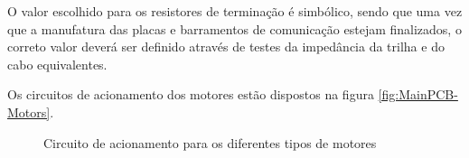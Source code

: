O valor escolhido para os resistores de terminação é simbólico,
sendo que uma vez que a manufatura das placas e barramentos de comunicação
estejam finalizados, o correto valor deverá ser definido através de 
testes da impedância da trilha e do cabo equivalentes.

Os circuitos de acionamento dos motores estão dispostos na figura \ref{fig:MainPCB-Motors}.

\begin{figure}[h]

    \caption{Circuito de acionamento para os diferentes tipos de motores}    
    
    \begin{centering}
    \begin{floatrow}

    
    

\end{floatrow}
\end{centering}
\end{figure}
